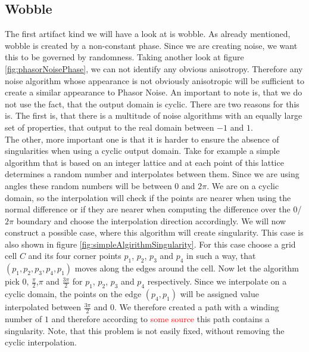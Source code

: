 \documentclass{utue} %
\begin{document}
\subsection{Wobble}\label{sec:wobble}
The first artifact kind we will have a look at is wobble. As already mentioned, wobble is created by a non-constant phase. Since we are creating noise, we want this to be governed by randomness. Taking another look at figure \ref{fig:phasorNoisePhase}, we can not identify any obvious anisotropy. Therefore any noise algorithm whose appearance is not obviously anisotropic will be sufficient to create a similar appearance to Phasor Noise. An important to note is, that we do not use the fact, that the output domain is cyclic. There are two reasons for this is. The first is, that there is a multitude of noise algorithms with an equally large set of properties, that output to the real domain between $-1$ and $1$.\\
The other, more important one is that it is harder to ensure the absence of singularities when using a cyclic output domain. Take for example a simple algorithm that is based on an integer lattice and at each point of this lattice determines a random number and interpolates between them. Since we are using angles these random numbers will be between $0$ and $2\pi$. We are on a cyclic domain, so the interpolation will check if the points are nearer when using the normal difference or if they are nearer when computing the difference over the $0$/$2\pi$ boundary and choose the interpolation direction accordingly. We will now construct a possible case, where this algorithm will create singularity. This case is also shown in figure \ref{fig:simpleAlgirithmSingularity}. For this case choose a grid cell $C$ and its four corner points $p_1$, $p_2$, $p_3$ and $p_4$ in such a way, that $(p_1,p_2,p_3,p_4,p_1)$ moves along the edges around the cell. Now let the algorithm pick $0$, $\frac{\pi}{2}$,$\pi$ and $\frac{3\pi}{2}$ for $p_1$, $p_2$, $p_3$ and $p_4$ respectively. Since we interpolate on a cyclic domain, the points on the edge $(p_4,p_1)$ will be assigned value interpolated between $\frac{3\pi}{2}$ and $0$. We therefore created a path with a winding number of $1$ and therefore according to \textcolor{red}{some source} this path contains a singularity. Note, that this problem is not easily fixed, without removing the cyclic interpolation.\\
\end{document}

